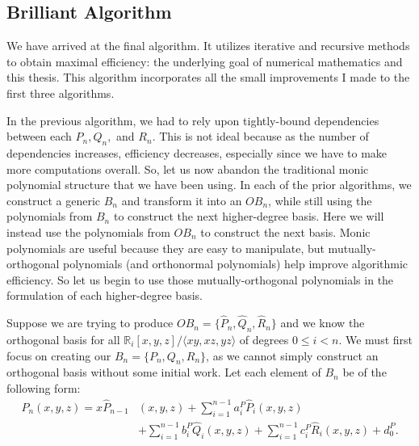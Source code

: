 \documentclass[letterpaper, 12pt]{article}
\begin{document}


\newpage
\begin{centering}\section{Brilliant Algorithm}\end{centering}

We have arrived at the final algorithm. It utilizes iterative and recursive methods to obtain maximal efficiency: the underlying goal of numerical mathematics and this thesis. This algorithm incorporates all the small improvements I made to the first three algorithms.

In the previous algorithm, we had to rely upon tightly-bound dependencies between each $P_n, Q_n,$ and $R_n$. This is not ideal because as the number of dependencies increases, efficiency decreases, especially since we have to make more computations overall. So, let us now abandon the traditional monic polynomial structure that we have been using. In each of the prior algorithms, we construct a generic $B_n$ and transform it into an $OB_n$, while still using the polynomials from $B_n$ to construct the next higher-degree basis. Here we will instead use the polynomials from $OB_n$ to construct the next basis. Monic polynomials are useful because they are easy to manipulate, but mutually-orthogonal polynomials (and orthonormal polynomials) help improve algorithmic efficiency. So let us begin to use those mutually-orthogonal polynomials in the formulation of each higher-degree basis.

Suppose we are trying to produce $OB_n = \{\hat{P}_n, \hat{Q}_n, \hat{R}_n\}$ and we know the orthogonal basis for all $\mathbb{R}_i [x, y, z] / \langle xy, xz, yz\rangle$ of degrees $0 \leq i < n$. We must first focus on creating our $B_n = \{P_n, Q_n, R_n\}$, as we cannot simply construct an orthogonal basis without some initial work. Let each element of $B_n$ be of the following form:
\begin{align*}
	P_n(x, y, z) = x\hat{P}_{n-1}&(x, y, z) + \sum_{i=1}^{n-1} a_i^P\hat{P}_i(x, y, z)\\ 
					&+ \sum_{i=1}^{n-1} b_i^P\hat{Q}_i(x, y, z) + \sum_{i=1}^{n-1} c_i^P\hat{R}_i(x, y, z) + d_0^P.
\end{align*}
\end{document}
